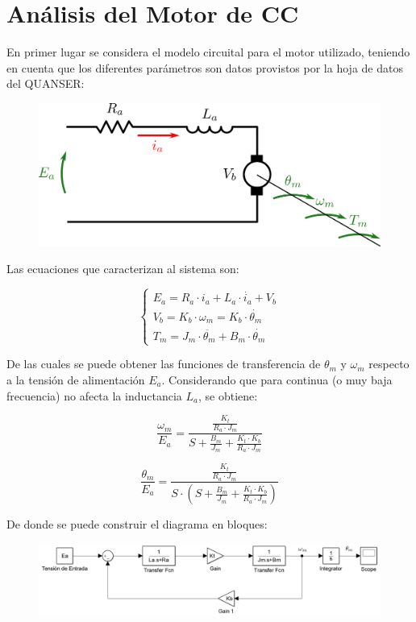 \documentclass{article}
\begin{document}



\tableofcontents
\newpage

\section{Análisis del Motor de CC}

En primer lugar se considera el modelo circuital para el motor utilizado, teniendo en cuenta que los diferentes parámetros son datos provistos por la hoja de datos del QUANSER:

\begin{figure}[H]
\centering
\includegraphics[width=0.5\linewidth]{../Images/ModeloMotor.png}
\end{figure}

Las ecuaciones que caracterizan al sistema son:

\[
\left\lbrace
\begin{array}{ll}
E_a = R_a \cdot i_a + L_a \cdot \dot{i_a} + V_b \\
V_b = K_b \cdot \omega_m = K_b \cdot \dot{\theta_m} \\
T_m = J_m \cdot \ddot{\theta_m} + B_m \cdot \dot{\theta_m}
\end{array}
\right.
\]

De las cuales se puede obtener las funciones de transferencia de $\theta_m$ y $\omega_m$ respecto a la tensión de alimentación $E_a$. Considerando que para continua (o muy baja frecuencia) no afecta la inductancia $L_a$, se obtiene:

\[
\frac{\omega_m}{E_a} = \frac{\frac{K_t}{R_a \cdot J_m}}{S + \frac{B_m}{J_m} + \frac{K_t \cdot K_b}{R_a \cdot J_m}}
\]

\[
\frac{\theta_m}{E_a} = \frac{\frac{K_t}{R_a \cdot J_m}}{S \cdot (S + \frac{B_m}{J_m} + \frac{K_t \cdot K_b}{R_a \cdot J_m})}
\]

De donde se puede construir el diagrama en bloques:

\begin{figure}[H]
\centering
\includegraphics[width=1\linewidth]{../Images/DiagramaSimple.png}
\end{figure}
\end{document}

